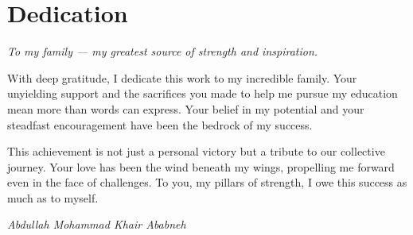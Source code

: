 \chapter*{Dedication}

\begin{center}
\emph{To my family --- my greatest source of strength and inspiration.}
\end{center}

\vspace{1cm}

With deep gratitude, I dedicate this work to my incredible family. Your unyielding
support and the sacrifices you made to help me pursue my education mean more than
words can express. Your belief in my potential and your steadfast encouragement have
been the bedrock of my success.

This achievement is not just a personal victory but a tribute to our collective journey.
Your love has been the wind beneath my wings, propelling me forward even in the face of
challenges. To you, my pillars of strength, I owe this success as much as to myself.

\vspace{2cm}
\begin{flushright}
\textit{Abdullah Mohammad Khair Ababneh}
\end{flushright}

\newpage
